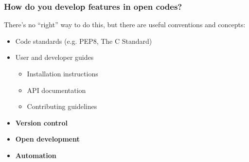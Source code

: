 \begin{frame}[t]
    \frametitle{How do you develop features in open codes?}

    There's no ``right'' way to do this, but there are useful conventions and concepts:
    \begin{itemize}
        \item Code standards (e.g. PEP8, The C Standard)
        \item User and developer guides
        \begin{itemize}
            \item Installation instructions
            \item API documentation
            \item Contributing guidelines
        \end{itemize}
        \item {\bf Version control}
        \item {\bf Open development}
        \item {\bf Automation}
    \end{itemize}
\end{frame}
